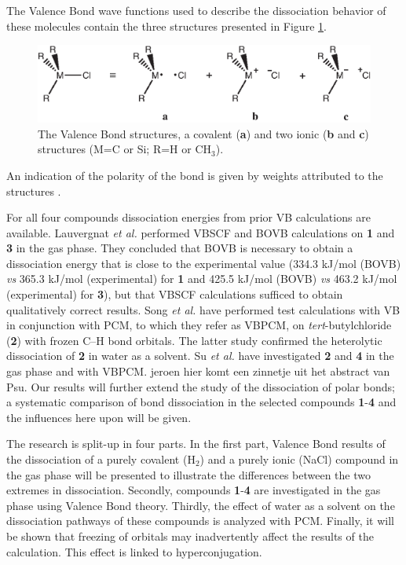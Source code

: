 The Valence Bond wave functions used to describe the dissociation behavior of these molecules contain the three structures presented in Figure \ref{ch3.fig.structures}.
\begin{figure}[htbp]
\begin{center}
\includegraphics{dissociation/figures/structures.eps}
\end{center}
\caption{The Valence Bond structures, a covalent (\textbf{a}) and two ionic (\textbf{b} and \textbf{c}) structures (M=C or Si; R=H or CH$_3$).}
\label{ch3.fig.structures}
\end{figure}
An indication of the polarity of the bond is given by weights attributed to the structures \cite{coulson}. 

For all four compounds dissociation energies from prior VB calculations are available. Lauvergnat \textit{et al.} \cite{lauvergnat} performed VBSCF \cite{vbscf1,vbscf2} and BOVB \cite{bovb1,bovb2,bovb3} calculations on \textbf{1} and \textbf{3} in the gas phase. They concluded that BOVB is necessary to obtain a dissociation energy that is close to the experimental value (334.3 kJ/mol (BOVB) \textit{vs} 365.3 kJ/mol (experimental) for \textbf{1} and 425.5 kJ/mol (BOVB) \textit{vs} 463.2 kJ/mol (experimental) for \textbf{3}), but that VBSCF calculations sufficed to obtain qualitatively correct results.  Song \textit{et al.} \cite{song} have performed test calculations with VB in conjunction with PCM, to which they refer as VBPCM, on \textit{tert}-butylchloride (\textbf{2}) with frozen C--H bond orbitals. The latter study confirmed the heterolytic dissociation of \textbf{2} in water as a solvent. Su \textit{et al.} \cite{psu} have investigated \textbf{2} and \textbf{4} in the gas phase and with VBPCM. jeroen hier komt een zinnetje uit het abstract van Psu. Our results will further extend the study of the dissociation of polar bonds; a systematic comparison of bond dissociation in the selected compounds \textbf{1}-\textbf{4} and the influences here upon will be given.

The research is split-up in four parts.  In the first part, Valence Bond results of the dissociation of a purely covalent (H$_2$) and a purely ionic (NaCl) compound in the gas phase will be presented to illustrate the differences between the two extremes in dissociation.
Secondly, compounds \textbf{1}-\textbf{4} are investigated in the gas phase using Valence Bond theory. Thirdly, the effect of water as a solvent on the dissociation pathways of these compounds is analyzed with PCM. Finally, it will be shown that freezing of orbitals may inadvertently affect the results of the calculation. This effect is linked to hyperconjugation.

